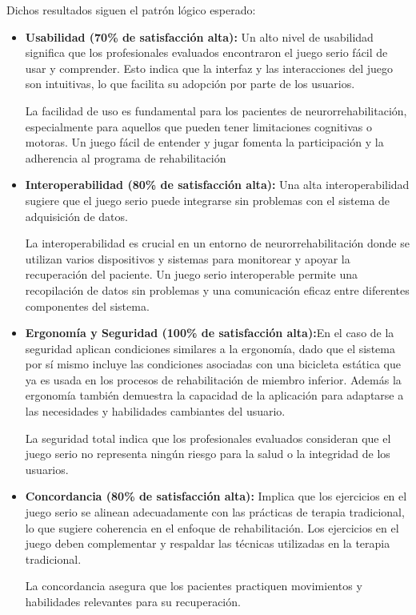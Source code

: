 Dichos resultados siguen el patrón lógico esperado:
\begin{itemize}
    \item \textbf{Usabilidad (70\% de satisfacción alta):} Un alto nivel de usabilidad significa que los profesionales evaluados encontraron el juego serio fácil de usar y comprender. Esto indica que la interfaz y las interacciones del juego son intuitivas, lo que facilita su adopción por parte de los usuarios.
    
    La facilidad de uso es fundamental para los pacientes de neurorrehabilitación, especialmente para aquellos que pueden tener limitaciones cognitivas o motoras. Un juego fácil de entender y jugar fomenta la participación y la adherencia al programa de rehabilitación


    \item \textbf{Interoperabilidad (80\% de satisfacción alta):} Una alta interoperabilidad sugiere que el juego serio puede integrarse sin problemas con el sistema de adquisición de datos.
    
    La interoperabilidad es crucial en un entorno de neurorrehabilitación donde se utilizan varios dispositivos y sistemas para monitorear y apoyar la recuperación del paciente. Un juego serio interoperable permite una recopilación de datos sin problemas y una comunicación eficaz entre diferentes componentes del sistema.


    \item \textbf{Ergonomía y Seguridad (100\% de satisfacción alta):}En el caso de la seguridad aplican condiciones similares a la ergonomía, dado que el sistema por sí mismo incluye las condiciones asociadas con una bicicleta estática que ya es usada en los procesos de rehabilitación de miembro inferior. Además la ergonomía también demuestra la capacidad de la aplicación para adaptarse a las necesidades y habilidades cambiantes del usuario. 
    
    La seguridad total indica que los profesionales evaluados consideran que el juego serio no representa ningún riesgo para la salud o la integridad de los usuarios.
    
    \item \textbf{Concordancia (80\% de satisfacción alta):} Implica que los ejercicios en el juego serio se alinean adecuadamente con las prácticas de terapia tradicional, lo que sugiere coherencia en el enfoque de rehabilitación. Los ejercicios en el juego deben complementar y respaldar las técnicas utilizadas en la terapia tradicional. 
    
    La concordancia asegura que los pacientes practiquen movimientos y habilidades relevantes para su recuperación.
\end{itemize}

